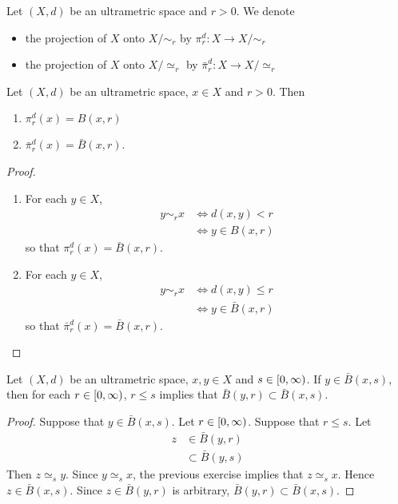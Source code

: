 \documentclass{book}
\begin{document}
\begin{defn}
	Let $(X, d)$ be an ultrametric space and $r > 0$. We denote
	\begin{itemize}
		\item the projection of $X$ onto $X/ {\sim_r}$ by $\pi^d_r: X \rightarrow X/ {\sim_r}$
		\item the projection of $X$ onto $X/ {\simeq_r}$ by $\bar{\pi}^d_r: X \rightarrow X/ {\simeq_r}$
	\end{itemize}
\end{defn}

\begin{ex}
	Let $(X, d)$ be an ultrametric space, $x \in X$ and $r >0$. Then 
	\begin{enumerate}
		\item $\pi^d_r(x) = B(x, r)$
		\item $\bar{\pi}^d_r(x) = \bar{B}(x, r)$.
	\end{enumerate} 
\end{ex}

\begin{proof} \
	\begin{enumerate}
		\item For each $y \in X$,
		\begin{align*}
			y \sim_r x
			& \iff d(x,y) < r \\
			& \iff y \in B(x, r)
		\end{align*}
		so that $\pi^d_r(x) = \bar{B}(x,r)$.
		\item For each $y \in X$,
		\begin{align*}
			y \sim_r x
			& \iff d(x,y) \leq r \\
			& \iff y \in \bar{B}(x, r)
		\end{align*}
		so that $\bar{\pi}^d_r(x) = \bar{B}(x,r)$.
	\end{enumerate}
\end{proof}

\begin{ex}
	Let $(X, d)$ be an ultrametric space, $x,y \in X$ and $s \in [0,\infty)$. If $y \in \bar{B}(x, s)$, then for each $r \in [0,\infty)$, $r \leq s$ implies that $\bar{B}(y, r) \subset \bar{B}(x, s)$. 
\end{ex}

\begin{proof}
	Suppose that $y \in \bar{B}(x, s)$. Let $r \in [0,\infty)$. Suppose that $r \leq s$. Let  
	\begin{align*}
		z 
		& \in \bar{B}(y, r) \\
		& \subset \bar{B}(y, s)
	\end{align*}
	Then $z \simeq_s y$. Since $y \simeq_s x$, the previous exercise implies that $z \simeq_s x$. Hence $z \in \bar{B}(x, s)$. Since $z \in \bar{B}(y, r)$ is arbitrary, $\bar{B}(y, r) \subset \bar{B}(x, s)$. 
\end{proof}
\end{document}
